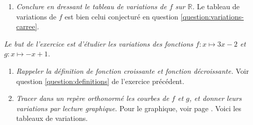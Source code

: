 \documentclass[11pt]{article}
\begin{document}
\begin{exercice}
\begin{enumerate}
\begin{multicols}{2}
      Nous avons montré que si $a<b$, alors $f(a)>f(b)$. Donc la fonction carrée est positive sur les nombres négatifs.
    \end{multicols}
    \item \emph{Conclure en dressant le tableau de variations de $f$ sur $\mathbb{R}$.}
      Le tableau de variations de $f$ est bien celui conjecturé en question \ref{question:variations-carree}.

  \end{enumerate}

\end{exercice}

\begin{exercice}\label{exo:droites}
  \emph{Le but de l'exercice est d'étudier les variations des fonctions $f:x\mapsto 3x-2$ et $g:x\mapsto -x+1$.}
  \begin{enumerate}
    \item \emph{Rappeler la définition de \emph{fonction croissante} et \emph{fonction décroissante}.}
      Voir question \ref{question:definitions} de l'exercice précédent.
    \item \emph{Tracer dans un repère orthonormé les courbes de $f$ et $g$, et donner leurs variations par lecture graphique.}
        Pour le graphique, voir page \pageref{figure:courbes}. Voici les tableaux de variations.

      \begin{multicols}{2}
        \begin{center}
      \end{center}


\end{multicols}
\end{enumerate}
\end{exercice}
\end{document}
